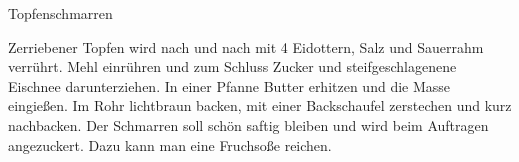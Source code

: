 \begin{recipe}[\vegetarian]{Topfenschmarren}
%
%
%
%
%
%

\begin{ingredients}
\end{ingredients}

\begin{instructions}
    Zerriebener Topfen wird nach und nach mit 4 Eidottern, Salz und Sauerrahm verrührt.
    Mehl einrühren und zum Schluss Zucker und steifgeschlagenene Eischnee darunterziehen.
    In einer Pfanne Butter erhitzen und die Masse eingießen.
    Im Rohr lichtbraun backen, mit einer Backschaufel zerstechen und kurz nachbacken.
    Der Schmarren soll schön saftig bleiben und wird beim Auftragen angezuckert.
    Dazu kann man eine Fruchsoße reichen.
\end{instructions}
\end{recipe}
